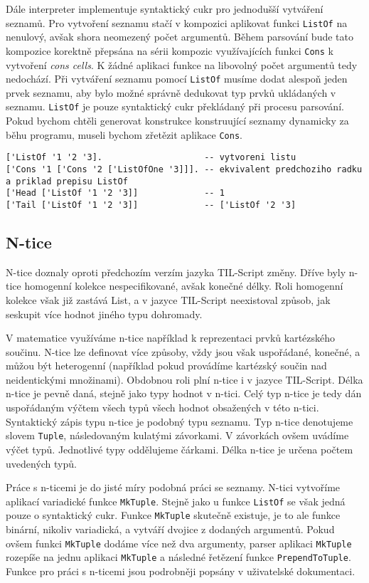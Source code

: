 Dále interpreter implementuje syntaktický cukr pro jednodušší vytváření seznamů. Pro vytvoření
seznamu stačí v kompozici aplikovat funkci \lstinline{ListOf} na nenulový, avšak shora neomezený
počet argumentů. Během parsování bude tato kompozice korektně přepsána na sérii kompozic
využívajících funkci \lstinline{Cons} k vytvoření \textit{cons cells}. K žádné aplikaci funkce
na libovolný počet argumentů tedy nedochází. Při vytváření seznamu pomocí \lstinline{ListOf} musíme
dodat alespoň jeden prvek seznamu, aby bylo možné správně dedukovat typ prvků ukládaných v seznamu.
\lstinline{ListOf} je pouze syntaktický cukr překládaný při procesu parsování. Pokud bychom chtěli
generovat konstrukce konstruující seznamy dynamicky za běhu programu, museli bychom zřetězit
aplikace \lstinline{Cons}.

\begin{lstlisting}[caption={Příklad využití seznamů}]
['ListOf '1 '2 '3].                    -- vytvoreni listu
['Cons '1 ['Cons '2 ['ListOfOne '3]]]. -- ekvivalent predchoziho radku a priklad prepisu ListOf
['Head ['ListOf '1 '2 '3]]             -- 1
['Tail ['ListOf '1 '2 '3]]             -- ['ListOf '2 '3]
\end{lstlisting}

\subsection{N-tice}

N-tice doznaly oproti předchozím verzím jazyka TIL-Script změny. Dříve byly n-tice homogenní kolekce
nespecifikované, avšak konečné délky. Roli homogenní kolekce však již zastává List, a v jazyce
TIL-Script neexistoval způsob, jak seskupit více hodnot jiného typu dohromady.

V matematice využíváme n-tice například k reprezentaci prvků kartézského součinu. N-tice lze
definovat více způsoby, vždy jsou však uspořádané, konečné, a můžou být heterogenní (například
pokud provádíme kartézský součin nad neidentickými množinami). Obdobnou roli plní n-tice i v jazyce
TIL-Script. Délka n-tice je pevně daná, stejně jako typy hodnot v n-tici. Celý typ n-tice je
tedy dán uspořádaným výčtem všech typů všech hodnot obsažených v této n-tici. Syntaktický zápis
typu n-tice je podobný typu seznamu. Typ n-tice denotujeme slovem \lstinline{Tuple}, následovaným
kulatými závorkami. V závorkách ovšem uvádíme výčet typů. Jednotlivé typy oddělujeme čárkami. Délka
n-tice je určena počtem uvedených typů.

Práce s n-ticemi je do jisté míry podobná práci se seznamy. N-tici vytvoříme aplikací variadické
funkce \lstinline{MkTuple}. Stejně jako u funkce \lstinline{ListOf} se však jedná pouze o
syntaktický cukr. Funkce \lstinline{MkTuple} skutečně existuje, je to ale funkce binární, nikoliv
variadická, a vytváří dvojice z dodaných argumentů. Pokud ovšem funkci \lstinline{MkTuple} dodáme
více než dva argumenty, parser aplikaci \lstinline{MkTuple} rozepíše na jednu aplikaci
\lstinline{MkTuple} a následné řetězení funkce \lstinline{PrependToTuple}. Funkce pro práci
s n-ticemi jsou podrobněji popsány v uživatelské dokumentaci.
 
